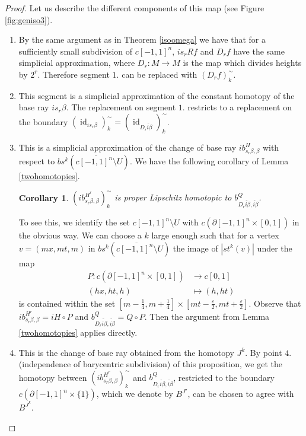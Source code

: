 \documentclass[a4paper,11pt]{article}
\theoremstyle{definition}
\theoremstyle{plain}
\newtheorem{cor}[definition]{Corollary}
\theoremstyle{remark}
\DeclareMathOperator{\id}{id}
\begin{document}
{\begin{proof}
Let us describe the different components of this map (see Figure \ref{fig:geniso3}). 



\begin{enumerate}
\item By the same argument as in Theorem  \ref{isoomega} we have that for a sufficiently small subdivision of $c[-1,1]^n$, $is_{r}Rf$ and $D_{r}f$ have the same simplicial approximation, where $D_{r}: M\rightarrow M$ is the map which divides heights by $2^{r}$. Therefore segment $1.$ can be replaced with $(D_{r}f)^{\sim}_{k}$. 
\item This segment is a simplicial approximation of the constant homotopy of the base ray $is_{r}\beta$. The replacement on segment $1$. restricts to a replacement on the boundary $(\id_{is_{r}\beta})^{\sim}_{k} = (\id_{D_{r}\widetilde{i\beta}})^{\sim}_{k}$.   
\item This is a simplicial approximation of the change of base ray $ib^{H}_{s_{r}\beta, \beta}$ with respect to $bs^{k}(c\overline{[-1,1]^n}\setminus U)$. We have the following corollary of Lemma  \ref{twohomotopies}. 
\begin{cor} $(ib^{H^{r}}_{s_{r}\beta, \beta})^{\sim}_{k}$ is proper Lipschitz homotopic to $b^{Q}_{D_{r}\widetilde{i\beta}, \widetilde{i\beta}}$. 
\end{cor}
To see this, we identify the set $c[-1,1]^n\setminus U$ with $c(\partial[-1,1]^n \times [0,1])$ in the obvious way. We can choose a $k$ large enough such that for a vertex $v=(mx,mt,m)$ in $bs^{k}(c\overline{[-1,1]^n}\setminus U)$ the image of $|st^{k}(v)|$ under the map 
\begin{align*}
P: c(\partial[-1,1]^n \times [0,1]) &\rightarrow c[0,1]\\
(hx,ht,h)&\mapsto (h,ht)
\end{align*}
is contained within the set $[m-\frac{1}{4}, m+\frac{1}{4}] \times [mt-\frac{\varepsilon}{2}, mt+\frac{\varepsilon}{2}]$. Observe that $ib^{H^{r}}_{s_{r}\beta, \beta}=iH \circ P$ and $b^{Q}_{D_{r}\widetilde{i\beta}, \widetilde{i\beta}} = Q\circ P$. Then the argument from Lemma \ref{twohomotopies} applies directly. \\
\item This is the change of base ray obtained from the homotopy ${J^{k}}$. By point $4$. (independence of barycentric subdivision) of this proposition, we get the homotopy between $(ib^{H^{r}}_{s_{r}\beta, \beta})^{\sim}_{k}$ and  $b^{Q}_{D_{r}\widetilde{i\beta}, \widetilde{i\beta}}$, restricted to the boundary $c(\partial[-1,1]^n \times \{1\})$, which we denote by $B^{J'}$, can be chosen to agree with $B^{J^{k}}$. 
\end{enumerate}




\end{proof}}
\end{document}
